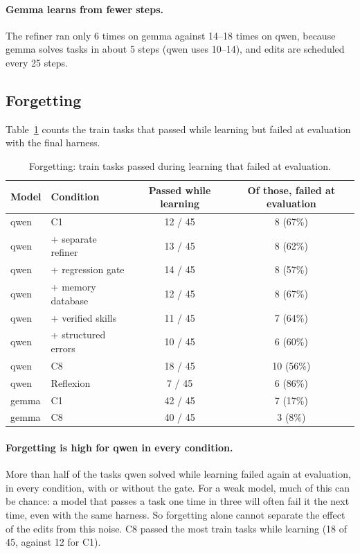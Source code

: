 \paragraph{Gemma learns from fewer steps.}
The refiner ran only 6 times on gemma against 14--18 times on qwen, because gemma solves tasks in
about 5 steps (qwen uses 10--14), and edits are scheduled every 25 steps.

\subsection{Forgetting}

Table~\ref{tab:forgetting} counts the train tasks that passed while learning but failed at
evaluation with the final harness.

\begin{table}[t]
\centering
\small
\begin{tabular}{llcc}
\toprule
Model & Condition & Passed while learning & Of those, failed at evaluation \\
\midrule
qwen  & C1                  & 12 / 45 & 8 (67\%) \\
qwen  & + separate refiner  & 13 / 45 & 8 (62\%) \\
qwen  & + regression gate   & 14 / 45 & 8 (57\%) \\
qwen  & + memory database   & 12 / 45 & 8 (67\%) \\
qwen  & + verified skills   & 11 / 45 & 7 (64\%) \\
qwen  & + structured errors & 10 / 45 & 6 (60\%) \\
qwen  & C8                  & 18 / 45 & 10 (56\%) \\
qwen  & Reflexion           & 7 / 45  & 6 (86\%) \\
\midrule
gemma & C1                  & 42 / 45 & 7 (17\%) \\
gemma & C8                  & 40 / 45 & 3 (8\%) \\
\bottomrule
\end{tabular}
\caption{Forgetting: train tasks passed during learning that failed at evaluation.}
\label{tab:forgetting}
\end{table}

\paragraph{Forgetting is high for qwen in every condition.}
More than half of the tasks qwen solved while learning failed again at evaluation, in every
condition, with or without the gate. For a weak model, much of this can be chance: a model that
passes a task one time in three will often fail it the next time, even with the same harness. So
forgetting alone cannot separate the effect of the edits from this noise. C8 passed the most train
tasks while learning (18 of 45, against 12 for C1).

